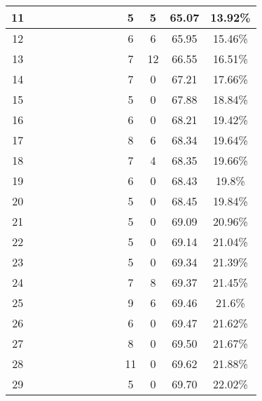 \begin{longtable}{|c|c|c|c|c|c|c|c|c|c|c|c|c|}
11 &  \x    & \x    & \x    &       & \x    & \x    & \x\m  &       & 5 & 5 & 65.07 & 13.92\% \\ \hline
12 &  \x    & \x    & \x    & \x    & \x\m  & \x\m  &       &       & 6 & 6 & 65.95 & 15.46\% \\ \hline
13 &  \x    & \x    & \x    & \x    & \x\m  & \x\m  & \x\m  &       & 7 & 12 & 66.55 & 16.51\% \\ \hline
14 &  \x    & \x    & \x    &       & \x    &       &       & \x\m  & 7 & 0 & 67.21 & 17.66\% \\ \hline
15 &  \x    & \x    & \x    & \x    & \x    & \x    &       &       & 5 & 0 & 67.88 & 18.84\% \\ \hline
16 &  \x    & \x    & \x    &       & \x    & \x    &       & \x    & 6 & 0 & 68.21 & 19.42\% \\ \hline
17 &  \x    & \x    & \x    &       & \x\m  & \x\m  &       &       & 8 & 6 & 68.34 & 19.64\% \\ \hline
18 &  \x    & \x    & \x    &       & \x\m  &       &       & \x\m  & 7 & 4 & 68.35 & 19.66\% \\ \hline
19 &  \x    & \x    & \x    & \x    & \x    & \x    & \x    &       & 6 & 0 & 68.43 & 19.8\% \\ \hline
20 &  \x    & \x    & \x    & \x    & \x    &       &       & \x\m  & 5 & 0 & 68.45 & 19.84\% \\ \hline
21 &  \x    & \x    & \x    &       & \x    &       &       &       & 5 & 0 & 69.09 & 20.96\% \\ \hline
22 &  \x    & \x    & \x    & \x    &       & \x    &       &       & 5 & 0 & 69.14 & 21.04\% \\ \hline
23 &  \x    & \x    & \x    &       & \x    &       & \x    &       & 5 & 0 & 69.34 & 21.39\% \\ \hline
24 &  \x    & \x    & \x    & \x    & \x\m  & \x    & \x    &       & 7 & 8 & 69.37 & 21.45\% \\ \hline
25 &  \x    & \x    & \x    & \x    & \x\m  &       &       & \x\m  & 9 & 6 & 69.46 & 21.6\% \\ \hline
26 &  \x    & \x    & \x    & \x    & \x    & \x\m  & \x    &       & 6 & 0 & 69.47 & 21.62\% \\ \hline
27 &  \x    & \x    & \x    & \x    &       & \x\m  &       &       & 8 & 0 & 69.50 & 21.67\% \\ \hline
28 &  \x    & \x    & \x    & \x    & \x    &       &       &       & 11 & 0 & 69.62 & 21.88\% \\ \hline
29 &  \x    & \x    & \x    & \x    &       & \x    & \x    &       & 5 & 0 & 69.70 & 22.02\% \\ \hline

\end{longtable}
